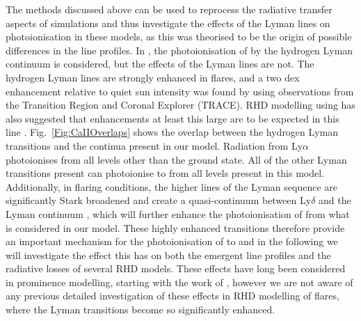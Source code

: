 The methods discussed above can be used to reprocess the radiative transfer aspects of \Radyn{} simulations and thus investigate the effects of the Lyman lines on \Caii{} photoionisation in these models, as this was theorised to be the origin of possible differences in the \Caii{} line profiles.
In \Radyn{}, the photoionisation of \Caii{} by the hydrogen Lyman continuum is considered, but the effects of the Lyman lines are not.
The hydrogen Lyman lines are strongly enhanced in flares, and a two dex enhancement relative to quiet sun intensity was found by \citet{RubioDaCosta2009} using observations from the Transition Region and Coronal Explorer (TRACE).
RHD modelling using \Radyn{} has also suggested that enhancements at least this large are to be expected in this line \citep{Brown2018, Hong2019}.
Fig.~\ref{Fig:CaIIOverlaps} shows the overlap between the hydrogen Lyman transitions and the \Caii{} continua present in our model.
Radiation from Ly$\alpha$ photoionises \Caii{} from all levels other than the ground state.
All of the other Lyman transitions present can photoionise \Caii{} to \Caiii{} from all levels present in this model.
Additionally, in flaring conditions, the higher lines of the Lyman sequence are significantly Stark broadened and create a quasi-continuum between Ly$\delta$ and the Lyman continuum \citep{DeFeiter1975}, which will further enhance the photoionisation of \Caii{} from what is considered in our model.
These highly enhanced transitions therefore provide an important mechanism for the photoionisation of \Caii{} to \Caiii{} and in the following we will investigate the effect this has on both the emergent line profiles and the radiative losses of several RHD models.
These effects have long been considered in prominence modelling, starting with the work of \citet{Ishizawa1971}, however we are not aware of any previous detailed investigation of these effects in RHD modelling of flares, where the Lyman transitions become so significantly enhanced.

